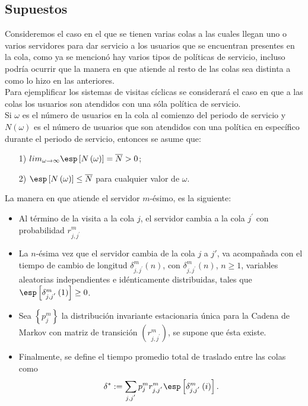 \subsection{Supuestos}
Consideremos el caso en el que se tienen varias colas a las cuales
llegan uno o varios servidores para dar servicio a los usuarios
que se encuentran presentes en la cola, como ya se mencion\'o hay
varios tipos de pol\'iticas de servicio, incluso podr\'ia ocurrir
que la manera en que atiende al resto de las colas sea distinta a
como lo hizo en las anteriores.\\

Para ejemplificar los sistemas de visitas c\'iclicas se
considerar\'a el caso en que a las colas los usuarios son atendidos con
una s\'ola pol\'itica de servicio.\\



Si $\omega$ es el n\'umero de usuarios en la cola al comienzo del
periodo de servicio y $N\left(\omega\right)$ es el n\'umero de
usuarios que son atendidos con una pol\'itica en espec\'ifico
durante el periodo de servicio, entonces se asume que:
\begin{itemize}
\item[1)]\label{S1}$lim_{\omega\rightarrow\infty}\esp\left[N\left(\omega\right)\right]=\overline{N}>0$;
\item[2)]\label{S2}$\esp\left[N\left(\omega\right)\right]\leq\overline{N}$
para cualquier valor de $\omega$.
\end{itemize}
La manera en que atiende el servidor $m$-\'esimo, es la siguiente:
\begin{itemize}
\item Al t\'ermino de la visita a la cola $j$, el servidor cambia
a la cola $j^{'}$ con probabilidad $r_{j,j^{'}}^{m}$

\item La $n$-\'esima vez que el servidor cambia de la cola $j$ a
$j'$, va acompa\~nada con el tiempo de cambio de longitud
$\delta_{j,j^{'}}^{m}\left(n\right)$, con
$\delta_{j,j^{'}}^{m}\left(n\right)$, $n\geq1$, variables
aleatorias independientes e id\'enticamente distribuidas, tales
que $\esp\left[\delta_{j,j^{'}}^{m}\left(1\right)\right]\geq0$.

\item Sea $\left\{p_{j}^{m}\right\}$ la distribuci\'on invariante
estacionaria \'unica para la Cadena de Markov con matriz de
transici\'on $\left(r_{j,j^{'}}^{m}\right)$, se supone que \'esta
existe.

\item Finalmente, se define el tiempo promedio total de traslado
entre las colas como
\begin{equation}
\delta^{*}:=\sum_{j,j^{'}}p_{j}^{m}r_{j,j^{'}}^{m}\esp\left[\delta_{j,j^{'}}^{m}\left(i\right)\right].
\end{equation}
\end{itemize}

